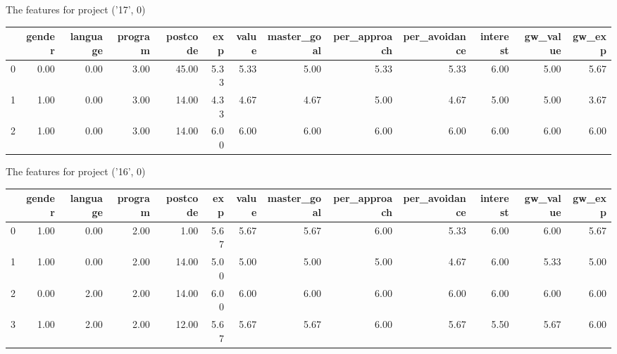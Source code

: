 \documentclass[7pt]{article}
\begin{document}
\begin{landscape}
The features for project ('17', 0)\newline
\begin{tabular}{lrrrrrrrrrrrr}
\toprule
{} &  gender &  language &  program &  postcode &  exp &  value &  master\_goal &  per\_approach &  per\_avoidance &  interest &  gw\_value &  gw\_exp \\
\midrule
0 &    0.00 &      0.00 &     3.00 &     45.00 & 5.33 &   5.33 &         5.00 &          5.33 &           5.33 &      6.00 &             5.00 &           5.67 \\
1 &    1.00 &      0.00 &     3.00 &     14.00 & 4.33 &   4.67 &         4.67 &          5.00 &           4.67 &      5.00 &             5.00 &           3.67 \\
2 &    1.00 &      0.00 &     3.00 &     14.00 & 6.00 &   6.00 &         6.00 &          6.00 &           6.00 &      6.00 &             6.00 &           6.00 \\
\bottomrule
\end{tabular}

The features for project ('16', 0)\newline
\begin{tabular}{lrrrrrrrrrrrr}
\toprule
{} &  gender &  language &  program &  postcode &  exp &  value &  master\_goal &  per\_approach &  per\_avoidance &  interest &  gw\_value &  gw\_exp \\
\midrule
0 &    1.00 &      0.00 &     2.00 &      1.00 & 5.67 &   5.67 &         5.67 &          6.00 &           5.33 &      6.00 &             6.00 &           5.67 \\
1 &    1.00 &      0.00 &     2.00 &     14.00 & 5.00 &   5.00 &         5.00 &          5.00 &           4.67 &      6.00 &             5.33 &           5.00 \\
2 &    0.00 &      2.00 &     2.00 &     14.00 & 6.00 &   6.00 &         6.00 &          6.00 &           6.00 &      6.00 &             6.00 &           6.00 \\
3 &    1.00 &      2.00 &     2.00 &     12.00 & 5.67 &   5.67 &         5.67 &          6.00 &           5.67 &      5.50 &             5.67 &           6.00 \\
\bottomrule
\end{tabular}


\end{landscape}
\end{document}
